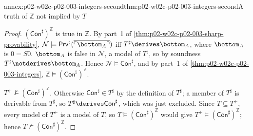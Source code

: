 \begin{annexitem}{annex:p02-w02c-p02-003-integers-second}{thm:p02-w02c-p02-003-integers-second}{A truth of \(\mathbb Z\) not implied by \(T\)}
\begin{proof}
\((\mathsf{Con}^{\sharp})^{\mathbb Z}\) is true in \(\mathbb Z\).  By part~1
of \cref{thm:p02-w02c-p02-003-sharp-provability},
\(\mathcal N\models\mathsf{Prv}^{\sharp}(\overline{\ulcorner\bottom_A
\urcorner})\) iff \(T^{\sharp}\derives\bottom_A\), where \(\bottom_A\) is
\(0=S0\).  \(\bottom_A\) is false in \(\mathcal N\), a model of
\(T^{\sharp}\), so by soundness \(T^{\sharp}\notderives\bottom_A\).  Hence
\(\mathcal N\models\mathsf{Con}^{\sharp}\), and by part~1 of
\cref{thm:p02-w02c-p02-003-integers},
\(\mathbb Z\models(\mathsf{Con}^{\sharp})^{\mathbb Z}\).

\(T^{+}\not\models(\mathsf{Con}^{\sharp})^{\mathbb Z}\).  Otherwise
\(\mathsf{Con}^{\sharp}\in T^{\sharp}\) by the definition of
\(T^{\sharp}\); a member of \(T^{\sharp}\) is derivable from \(T^{\sharp}\), so
\(T^{\sharp}\derives\mathsf{Con}^{\sharp}\), which was just excluded.  Since
\(T\subseteq T^{+}\), every model of \(T^{+}\) is a model of \(T\), so
\(T\models(\mathsf{Con}^{\sharp})^{\mathbb Z}\) would give
\(T^{+}\models(\mathsf{Con}^{\sharp})^{\mathbb Z}\); hence
\(T\not\models(\mathsf{Con}^{\sharp})^{\mathbb Z}\).
\end{proof}
\end{annexitem}

